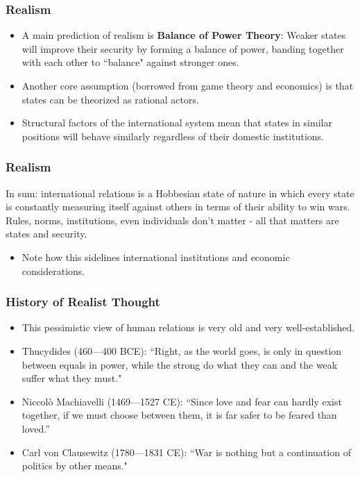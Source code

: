 \documentclass{beamer}
\begin{document}
        
        
\begin{frame} 
	\frametitle{\LARGE{Realism}}
	\begin{itemize}
		\item A main prediction of realism is \textbf{Balance of Power Theory}: Weaker states will improve their security by forming a balance of power, banding together with each other to ``balance" against stronger ones. \pause
		\item Another core assumption (borrowed from game theory and economics) is that states can be theorized as rational actors. \pause
		\item Structural factors of the international system mean that states in similar positions will behave similarly regardless of their domestic institutions.
	\end{itemize}
\end{frame}

\begin{frame} 
\frametitle{\LARGE{Realism}}
In sum: international relations is a Hobbesian state of nature in which every state is constantly measuring itself against others in terms of their ability to win wars. Rules, norms, institutions, even individuals don't matter - all that matters are states and security. \pause
\begin{itemize}
	\item Note how this sidelines international institutions and economic considerations.
\end{itemize}
\end{frame}

\begin{frame} 
\frametitle{\LARGE{History of Realist Thought}}
    \begin{itemize}
    	\item This pessimistic view of human relations is very old and very well-established.
        \item Thucydides (460---400 BCE): \pause ``Right, as the world goes, is only in question between equals in power, while the strong do what they can and the weak suffer what they must."
        \item Niccolò Machiavelli (1469---1527 CE): \pause ``Since love and fear can hardly exist together, if we must choose between them, it is far safer to be feared than loved.” 
        \item Carl von Clausewitz (1780---1831 CE): \pause ``War is nothing but a continuation of politics by other means." 
    \end{itemize}
\end{frame}
\end{document}
